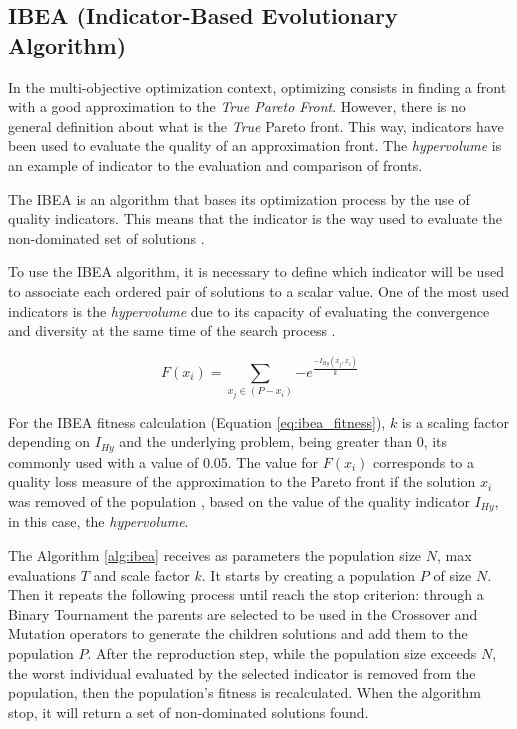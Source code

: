 \subsection{IBEA (Indicator-Based Evolutionary Algorithm)}


In the multi-objective optimization context, optimizing consists in finding a front with a good approximation to the \textit{True Pareto Front}. However, there is no general definition about what is the \textit{True} Pareto front. This way, indicators have been used to evaluate the quality of an approximation front. The \textit{hypervolume} is an example of indicator to the evaluation and comparison of fronts.


The IBEA is an algorithm that bases its optimization process by the use of quality indicators. This means that the indicator is the way used to evaluate the non-dominated set of solutions \cite{figueiredo2013algoritmo}.


To use the IBEA algorithm, it is necessary to define which indicator will be used to associate each ordered pair of solutions to a scalar value. One of the most used indicators is the \textit{hypervolume} due to its capacity of evaluating the convergence and diversity at the same time of the search process \cite{ishibuchi2008evolutionary}.

\begin{equation} \label{eq:ibea_fitness}
	F(x_i) = \sum_{x_j \in (P-x_i)} {-e^\frac{-I_{Hy}(x_j,x_i)}{k}}
\end{equation}


For the IBEA fitness calculation (Equation \ref{eq:ibea_fitness}), $k$ is a scaling factor depending on $I_{Hy}$ and the underlying problem, being greater than 0, its commonly used with a value of 0.05. The value for $F(x_i)$ corresponds to a quality loss measure of the approximation to the Pareto front if the solution $x_i$ was removed of the population \cite{figueiredo2013algoritmo}, based on the value of the quality indicator $I_{Hy}$, in this case, the \textit{hypervolume}.


The Algorithm \ref{alg:ibea} receives as parameters the population size $N$, max evaluations $T$ and scale factor $k$. It starts by creating a population $P$ of size $N$. Then it repeats the following process until reach the stop criterion: through a Binary Tournament the parents are selected to be used in the Crossover and Mutation operators to generate the children solutions and add them to the population $P$. After the reproduction step, while the population size exceeds $N$, the worst individual evaluated by the selected indicator is removed from the population, then the population's fitness is recalculated. When the algorithm stop, it will return a set of non-dominated solutions found.

